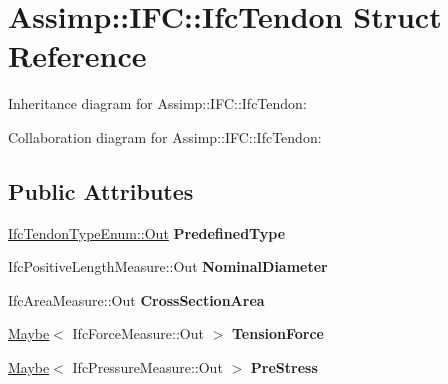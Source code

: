 \hypertarget{struct_assimp_1_1_i_f_c_1_1_ifc_tendon}{\section{Assimp\+:\+:I\+F\+C\+:\+:Ifc\+Tendon Struct Reference}
\label{struct_assimp_1_1_i_f_c_1_1_ifc_tendon}
}


Inheritance diagram for Assimp\+:\+:I\+F\+C\+:\+:Ifc\+Tendon\+:


Collaboration diagram for Assimp\+:\+:I\+F\+C\+:\+:Ifc\+Tendon\+:
\subsection*{Public Attributes}
\begin{DoxyCompactItemize}
\item 
\hypertarget{struct_assimp_1_1_i_f_c_1_1_ifc_tendon_abfdfc1f2471cba463033f4a97afe8f9d}{\hyperlink{classboost_1_1shared__ptr}{Ifc\+Tendon\+Type\+Enum\+::\+Out} {\bfseries Predefined\+Type}}\label{struct_assimp_1_1_i_f_c_1_1_ifc_tendon_abfdfc1f2471cba463033f4a97afe8f9d}

\item 
\hypertarget{struct_assimp_1_1_i_f_c_1_1_ifc_tendon_ad12b6739a4c6aad5ec6c6e76c9b6f3f3}{Ifc\+Positive\+Length\+Measure\+::\+Out {\bfseries Nominal\+Diameter}}\label{struct_assimp_1_1_i_f_c_1_1_ifc_tendon_ad12b6739a4c6aad5ec6c6e76c9b6f3f3}

\item 
\hypertarget{struct_assimp_1_1_i_f_c_1_1_ifc_tendon_a5f22687eab667868529690f1b952f0ec}{Ifc\+Area\+Measure\+::\+Out {\bfseries Cross\+Section\+Area}}\label{struct_assimp_1_1_i_f_c_1_1_ifc_tendon_a5f22687eab667868529690f1b952f0ec}

\item 
\hypertarget{struct_assimp_1_1_i_f_c_1_1_ifc_tendon_a7d40421e2afbf49014a54f8c364721a7}{\hyperlink{struct_assimp_1_1_s_t_e_p_1_1_maybe}{Maybe}$<$ Ifc\+Force\+Measure\+::\+Out $>$ {\bfseries Tension\+Force}}\label{struct_assimp_1_1_i_f_c_1_1_ifc_tendon_a7d40421e2afbf49014a54f8c364721a7}

\item 
\hypertarget{struct_assimp_1_1_i_f_c_1_1_ifc_tendon_afabb8967c37042cc1836a94c5001cd86}{\hyperlink{struct_assimp_1_1_s_t_e_p_1_1_maybe}{Maybe}$<$ Ifc\+Pressure\+Measure\+::\+Out $>$ {\bfseries Pre\+Stress}}\label{struct_assimp_1_1_i_f_c_1_1_ifc_tendon_afabb8967c37042cc1836a94c5001cd86}


\end{DoxyCompactItemize}
